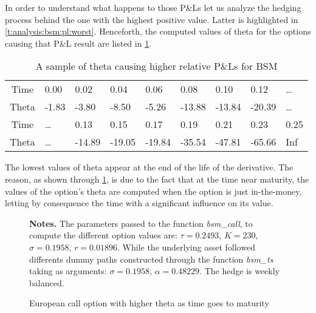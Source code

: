 \documentclass[a4paper, 12pt]{report}
\begin{document}
In order to understand what happens to those P\&Ls let us analyze the hedging process behind the one with the highest positive value. Latter is highlighted in \cref{t:analysis:bsm:pl:worst}.
Henceforth, the computed values of theta for the options causing that P\&L result are listed in \cref{t:analysis:bsm:pl:worst:theta}.

 
\begin{table}[h]
\centering
\begin{tabular}{c|llllllll}
  \hline
  \hline
  Time & 0.00 & 0.02 & 0.04 & 0.06 & 0.08 & 0.10 & 0.12 & \ldots\\ 
Theta & -1.83 & -3.80 & -8.50 & -5.26 & -13.88 & -13.84 & -20.39 & \ldots \\ 
   \hdashline
  Time & \ldots & 0.13 & 0.15 & 0.17 & 0.19 & 0.21 & 0.23 & 0.25 \\ 
  Theta & \ldots & -14.89 & -19.05 & -19.84 & -35.54 & -47.81 & -65.66 & Inf \\ 
   \hline
\end{tabular}
\caption{A sample of theta causing higher relative P\&Ls for BSM} 
\label{t:analysis:bsm:pl:worst:theta}
\end{table}



The lowest values of theta appear at the end of the life of the derivative. 
The reason, as shown through \cref{p:analysis:gbm:pl:theta:high},  is due to the fact that at the time near maturity, the values of the option's theta are computed when the option is just in-the-money, letting by consequence the time with a significant influence on its value.


\begin{figure}[h]
  \centering
  
  \caption{European call option with higher theta as time goes to maturity}
  \begin{changemargin}{0.5cm}{0.5cm}
  \medskip
\footnotesize
{}\textbf{Notes.} The parameters passed to the function \textit{bsm\_call}, to compute the different option values are: $\tau = 0.2493$, $K = 230$, $\sigma = 0.1958$, $r = 0.01896$. While the underlying asset followed differents dummy paths constructed through the function \textit{bsm\_ts} taking as arguments: $\sigma = 0.1958$, $\alpha = 0.48229$. The hedge is weekly balanced.
  \end{changemargin}
  \label{p:analysis:gbm:pl:theta:high}
\end{figure}
\end{document}
